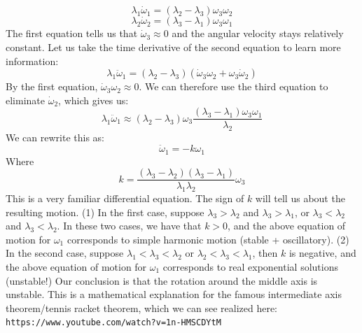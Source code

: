 \[\lambda_1\dot{\omega}_1 = (\lambda_2 - \lambda_3)\omega_3\omega_2\]
\[\lambda_2\dot{\omega}_2 = (\lambda_3 - \lambda_1)\omega_3\omega_1\]
The first equation tells us that $\dot{\omega}_3 \approx 0$ and the angular velocity stays relatively constant. Let us take the time derivative of the second equation to learn more information:
\[\lambda_1\ddot{\omega}_1 = (\lambda_2 - \lambda_3)(\dot{\omega}_3\omega_2 + \omega_3\dot{\omega}_2)\]
By the first equation, $\dot{\omega}_3\omega_2 \approx 0$. We can therefore use the third equation to eliminate $\dot{\omega}_2$, which gives us:
\[\lambda_1 \ddot{\omega}_1 \approx (\lambda_2 - \lambda_3)\omega_3\frac{(\lambda_3 - \lambda_1)\omega_3\omega_1}{\lambda_2}\]
We can rewrite this as:
\[\ddot{\omega}_1 = -k\omega_1\]
Where
\[k = \frac{(\lambda_3 - \lambda_2)(\lambda_3 - \lambda_1)}{\lambda_1\lambda_2}\omega_3\]
This is a very familiar differential equation. The sign of $k$ will tell us about the resulting motion.
\newline (1) In the first case, suppose $\lambda_3 > \lambda_2$ and $\lambda_3 > \lambda_1$, or $\lambda_3 < \lambda_2$ and $\lambda_3 < \lambda_2$. In these two cases, we have that $k > 0$, and the above equation of motion for $\omega_1$ corresponds to simple harmonic motion (stable + oscillatory). 
\newline (2) In the second case, suppose $\lambda_1 < \lambda_3 < \lambda_2$ or $\lambda_2 < \lambda_3 < \lambda_1$, then $k$ is negative, and the above equation of motion for $\omega_1$ corresponds to real exponential solutions (unstable!)
\newline Our conclusion is that the rotation around the middle axis is unstable. This is a mathematical explanation for the famous intermediate axis theorem/tennis racket theorem, which we can see realized here: \\ \texttt{https://www.youtube.com/watch?v=1n-HMSCDYtM}